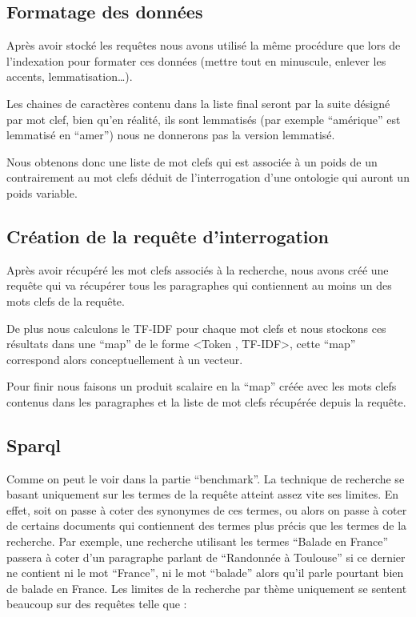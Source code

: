 \documentclass{article}
\begin{document}
\subsection{Formatage des données}

Après avoir stocké les requêtes nous avons utilisé la même procédure que lors de
l’indexation pour formater ces données (mettre tout en minuscule, enlever les
accents, lemmatisation…). 

Les chaines de caractères contenu dans la liste final seront par la suite désigné par
mot clef, bien qu’en réalité, ils sont lemmatisés (par exemple “amérique” est
lemmatisé en “amer”) nous ne donnerons pas la version lemmatisé.

Nous obtenons donc une liste de mot clefs qui est associée à un poids de un
contrairement au mot clefs déduit de l’interrogation d’une ontologie qui auront un
poids variable.


\subsection{Création de la requête d'interrogation}

Après avoir récupéré les mot clefs associés à la recherche, nous avons créé une
requête qui va récupérer tous les paragraphes qui contiennent au moins un des mots
clefs de la requête. 

De plus nous calculons le TF-IDF pour chaque mot clefs et nous stockons ces résultats
dans une “map” de le forme <Token , TF-IDF>, cette “map” correspond alors
conceptuellement à un vecteur. 

Pour finir nous faisons un produit scalaire en la “map” créée avec les mots clefs
contenus dans les paragraphes et la liste de mot clefs récupérée depuis la requête.

\subsection{Sparql}

Comme on peut le voir dans la partie “benchmark”. La technique de recherche se basant
uniquement sur les termes de la requête atteint assez vite ses limites. En effet,
soit on passe à coter des synonymes de ces termes, ou alors on passe à coter de
certains documents qui contiennent des termes plus précis que les termes de la
recherche. Par exemple, une recherche utilisant les termes “Balade en France” passera
à coter d’un paragraphe parlant de “Randonnée à Toulouse” si ce dernier ne contient
ni le mot “France”, ni le mot “balade” alors qu’il parle pourtant bien de balade en
France. Les limites de la recherche par thème uniquement se sentent beaucoup sur des
requêtes telle que :
\end{document}
